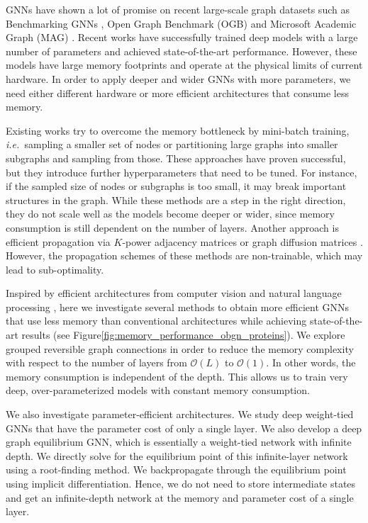 \documentclass{article}
\newcommand{\ie}{\emph{i.e.~}}
\newcommand{\figLabel}{Figure\xspace}
\begin{document}
GNNs have shown a lot of promise on recent large-scale graph datasets such as Benchmarking GNNs \citep{dwivedi2020benchmarkgnns}, Open Graph Benchmark (OGB) \citep{hu2020open,hu2021ogblsc} and Microsoft Academic Graph (MAG) \citep{wang2020microsoft}. Recent works \citep{li2019deepgcns,li2020deepergcn,chen2020simple} have successfully trained deep models with a large number of parameters and achieved state-of-the-art performance. 
However, these models have large memory footprints and operate at the physical limits of current hardware. 
In order to apply deeper and wider GNNs with more parameters, we need either different hardware or more efficient architectures that consume less memory.

Existing works try to overcome the memory bottleneck by mini-batch training, \ie sampling a smaller set of nodes \citep{hamilton2017inductive,chen2018stochastic,chen2018fastgcn} or partitioning large graphs \citep{chiang2019cluster,graphsaint-iclr20} into smaller subgraphs and sampling from those. These approaches have proven successful, but they introduce further hyperparameters that need to be tuned. For instance, if the sampled size of nodes or subgraphs is too small, it may break important structures in the graph. While these methods are a step in the right direction, they do not scale well as the models become deeper or wider, since memory consumption is still dependent on the number of layers.
Another approach is efficient propagation via $K$-power adjacency matrices or graph diffusion matrices \citep{wu2019simplifying,klicpera_predict_2019,bojchevski2020scaling,liu2020towards,sign_icml_grl2020}. However, the propagation schemes of these methods are non-trainable, which may lead to sub-optimality.

Inspired by efficient architectures from computer vision and natural language processing \citep{gomez2017reversible,xie2017aggregated,bai2018trellis,bai2019deep}, here we investigate several methods to obtain more efficient GNNs that use less memory than conventional architectures while achieving state-of-the-art results (see \figLabel \ref{fig:memory_performance_obgn_proteins}). We explore grouped reversible graph connections in order to reduce the memory complexity with respect to the number of layers from $\mathcal{O}(L)$ to $\mathcal{O}(1)$. In other words, the memory consumption is independent of the depth. This allows us to train very deep, over-parameterized models with constant memory consumption. 

We also investigate parameter-efficient architectures. We study deep weight-tied GNNs that have the parameter cost of only a single layer. We also develop a deep graph equilibrium GNN, which is essentially a weight-tied network with infinite depth. We directly solve for the equilibrium point of this infinite-layer network using a root-finding method. We backpropagate through the equilibrium point using implicit differentiation. Hence, we do not need to store intermediate states and get an infinite-depth network at the memory and parameter cost of a single layer.
\end{document}

